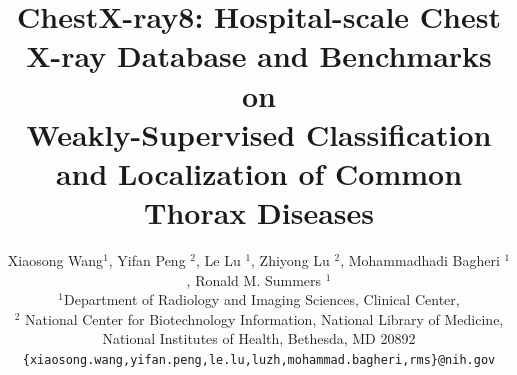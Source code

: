 \documentclass[10pt,twocolumn,letterpaper]{article}
\begin{document}
\jot=0pt \abovedisplayskip=3pt \belowdisplayskip=3pt
\abovedisplayshortskip=0pt \belowdisplayshortskip=0pt




\title{ChestX-ray8: Hospital-scale Chest X-ray Database and Benchmarks on \\ Weakly-Supervised Classification and Localization of Common Thorax Diseases}

\author{Xiaosong Wang$^1$, Yifan Peng $^2$, Le Lu $^1$, Zhiyong Lu $^2$, Mohammadhadi Bagheri $^1$, Ronald M. Summers $^1$ \\
$^1$Department of Radiology and Imaging Sciences, Clinical Center,\\
$^2$ National Center for Biotechnology Information, National Library of Medicine, \\
National Institutes of Health, Bethesda, MD 20892\\
{\tt\small \{xiaosong.wang,yifan.peng,le.lu,luzh,mohammad.bagheri,rms\}@nih.gov}
}



\maketitle

\end{document}
